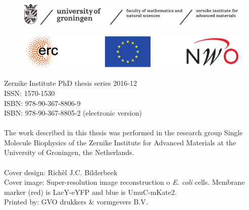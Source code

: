 \begin{titlepage}
%	

	
	
	
	
	\newpage \thispagestyle{empty}
	\vspace*{3.9cm}%
	
	
	\begin{figure}[!h]
		\includegraphics[width=\textwidth]{images/frontmatter/zernike.pdf}
	\end{figure}
	
	\vfill
	\begin{figure}[!h]
		\includegraphics[width=\textwidth]{images/frontmatter/all-logos.pdf}
	\end{figure}
	\noindent
	{\small 
		Zernike Institute PhD thesis series 2016-12 \\
		ISSN:   1570-1530\\
		ISBN:	978-90-367-8806-9 \\
		ISBN:   978-90-367-8805-2 (electronic version) \\
		\\
		The work described in this thesis was performed in the research group Single Molecule Biophysics of the Zernike Institute for Advanced Materials at the University of Groningen, the Netherlands. \\
		\\
		Cover design: Rich\`el J.C. Bilderbeek\\
		Cover image: Super-resolution image reconstruction o \textit{E. coli} cells. Membrane marker (red) is LacY-eYFP and blue is UmuC-mKate2.
		\\
		Printed by: GVO drukkers \& vormgevers B.V. \\
		} 	
	
	
	\clearpage
	
	
	
\end{titlepage}
